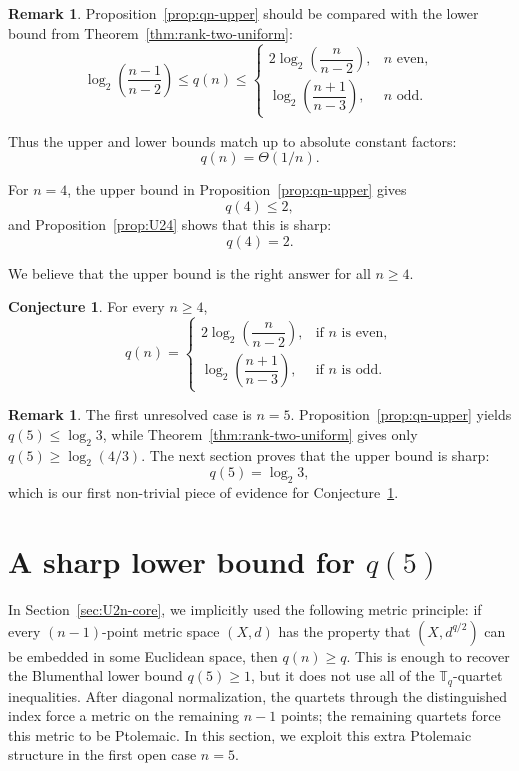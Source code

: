 \documentclass[12pt]{amsart}
\theoremstyle{definition}
\newtheorem{remark}[theorem]{Remark}
\newtheorem{conjecture}[theorem]{Conjecture}
\newcommand{\1}{\mathbf{1}}
\newcommand\T{{\mathbb T}}
\begin{document}
\begin{remark}
\label{rem:compare-upper-lower}
Proposition~\ref{prop:qn-upper} should be compared with the lower bound from
Theorem~\ref{thm:rank-two-uniform}:
\[
\log_2\!\left(\frac{n-1}{n-2}\right)
\le q(n)\le
\begin{cases}
2\log_2\!\left(\dfrac{n}{n-2}\right), & n \text{ even},\\[1.25ex]
\log_2\!\left(\dfrac{n+1}{n-3}\right), & n \text{ odd}.
\end{cases}
\]

Thus the upper and lower bounds match up to absolute constant factors:
\[
q(n)=\Theta(1/n).
\]
\end{remark}

For $n=4$, the upper bound in Proposition~\ref{prop:qn-upper} gives
\[
q(4)\le 2,
\]
and Proposition~\ref{prop:U24} shows that this is sharp:
\[
q(4)=2.
\]

We believe that the upper bound is the right answer for all $n\ge 4$.

\begin{conjecture}
\label{conj:qn-sharp}
For every $n\ge 4$,
\[
q(n)=
\begin{cases}
2\log_2\!\left(\dfrac{n}{n-2}\right), & \text{if } n \text{ is even},\\[1.25ex]
\log_2\!\left(\dfrac{n+1}{n-3}\right), & \text{if } n \text{ is odd}.
\end{cases}
\]
\end{conjecture}

\begin{remark}
\label{rem:section7-motivation}
The first unresolved case is $n=5$. Proposition~\ref{prop:qn-upper} yields
$q(5)\le \log_2 3$,
while Theorem~\ref{thm:rank-two-uniform} gives only $q(5)\ge \log_2(4/3)$.
The next section proves that the upper bound is sharp:
\[
q(5)=\log_2 3,
\]
which is our first non-trivial piece of evidence for Conjecture~\ref{conj:qn-sharp}.
\end{remark}


\section{A sharp lower bound for $q(5)$}
\label{sec:q5}

In Section~\ref{sec:U2n-core}, we implicitly used the following metric principle:
if every $(n-1)$-point metric space $(X,d)$ has the property that $(X,d^{q/2})$ can be embedded in some Euclidean space,
then $q(n)\ge q$.  This is enough to recover the Blumenthal lower bound
$q(5)\ge1$, but it does not use all of the $\T_q$-quartet inequalities.
After diagonal normalization, the quartets through the distinguished index force a
metric on the remaining $n-1$ points; the remaining quartets force this metric to be
Ptolemaic. In this section, we exploit this extra Ptolemaic structure in the first open case $n=5$.
\end{document}
